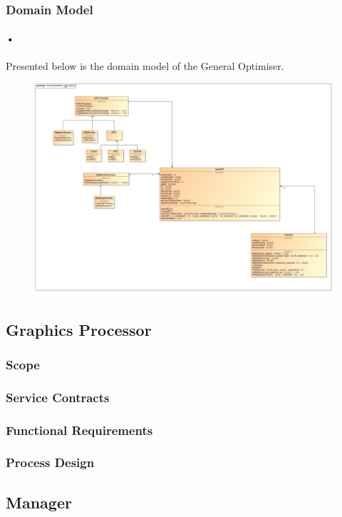 \documentclass[11pt]{article}
\begin{document}
\subsubsection{Domain Model}
\paragraph{•}
Presented below is the domain model of the General Optimiser.
\begin{figure}[h]
\includegraphics[scale=0.2]{OPTModel.png}
\end{figure}

\subsection{Graphics Processor}
\subsubsection{Scope}
\subsubsection{Service Contracts}
\subsubsection{Functional Requirements}
\subsubsection{Process Design}

\subsection{Manager}
\end{document}
